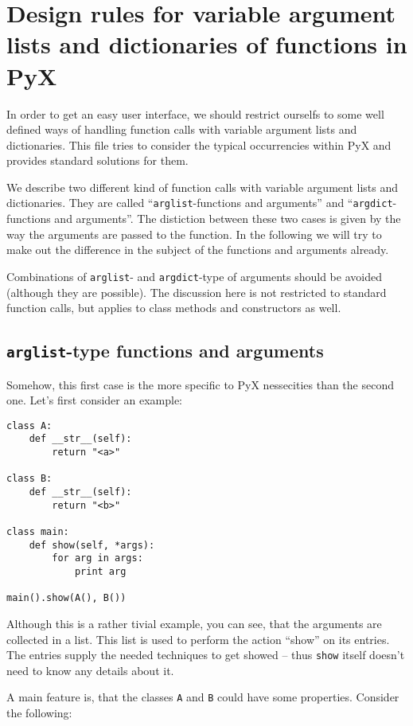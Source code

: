 \documentclass{article}
\begin{document}
\section*{Design rules for variable argument lists and dictionaries
of functions in PyX}

In order to get an easy user interface, we should restrict ourselfs to
some well defined ways of handling function calls with variable
argument lists and dictionaries. This file tries to consider the
typical occurrencies within PyX and provides standard solutions for
them.

We describe two different kind of function calls with variable
argument lists and dictionaries. They are called
``\verb|arglist|-functions and arguments'' and
``\verb|argdict|-functions and arguments''. The distiction between
these two cases is given by the way the arguments are passed to the
function. In the following we will try to make out the difference in
the subject of the functions and arguments already.

Combinations of \verb|arglist|- and \verb|argdict|-type of arguments
should be avoided (although they are possible). The discussion here is
not restricted to standard function calls, but applies to class
methods and constructors as well.

\subsection*{\texttt{arglist}-type functions and arguments}

Somehow, this first case is the more specific to PyX nessecities than
the second one. Let's first consider an example:

\begin{verbatim}
class A:
    def __str__(self):
        return "<a>"

class B:
    def __str__(self):
        return "<b>"

class main:
    def show(self, *args):
        for arg in args:
            print arg

main().show(A(), B())
\end{verbatim}

Although this is a rather tivial example, you can see, that the
arguments are collected in a list. This list is used to perform the
action ``show'' on its entries. The entries supply the needed
techniques to get showed -- thus \verb|show| itself doesn't need to
know any details about it.

A main feature is, that the classes \verb|A| and \verb|B| could have
some properties. Consider the following:
\end{document}
